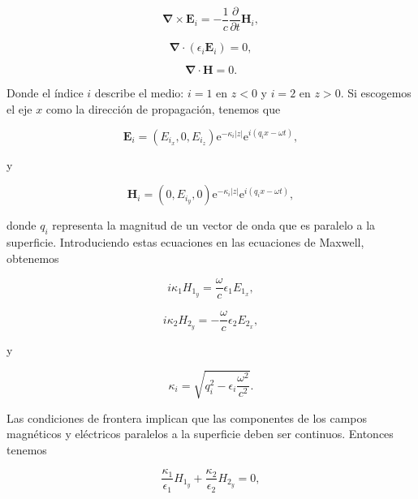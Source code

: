 \documentclass[a4paper,11pt]{article}
\numberwithin{equation}{section}
\newcommand{\euler}{\mathrm{e}}
\begin{document}
\begin{equation}
 \pmb{\nabla} \times \mathbf{E}_i = - \frac{1}{c} \frac{\partial}{\partial t} 
 \mathbf{H}_i,
\end{equation}

\begin{equation}
 \pmb{\nabla} \cdot (\epsilon_i \mathbf{E}_i) = 0,
\end{equation}

\begin{equation}
 \pmb{\nabla} \cdot \mathbf{H} = 0.
\end{equation}

Donde el índice $i$ describe el medio: $i = 1$ en $z < 0$ y $i = 2$ en $z > 0$. Si 
escogemos el eje $x$ como la dirección de propagación, tenemos que 

\begin{equation}
 \mathbf{E}_i = (E_{i_x},0,E_{i_z}) \euler^{-\kappa_i|z|} \euler^{i(q_i x - \omega t)},
\end{equation}

y 

\begin{equation}
 \mathbf{H}_i = (0,E_{i_y},0) \euler^{-\kappa_i|z|} \euler^{i(q_i x - \omega t)},
\end{equation}

donde $q_i$ representa la magnitud de un vector de onda que es paralelo a la 
superficie. Introduciendo estas ecuaciones en las ecuaciones de Maxwell, obtenemos 

\begin{equation}
 i \kappa_1 H_{1_y} = \frac{\omega}{c} \epsilon_1 E_{1_x}, 
\end{equation}

\begin{equation}
 i \kappa_2 H_{2_y} = - \frac{\omega}{c} \epsilon_2 E_{2_x},
\end{equation}

y 

\begin{equation}
 \kappa_i = \sqrt{q_i^2 - \epsilon_i \frac{\omega^2}{c^2}}.
\end{equation}

Las condiciones de frontera implican que las componentes de los campos magnéticos 
y eléctricos paralelos a la superficie deben ser continuos. Entonces tenemos 

\begin{equation}
 \frac{\kappa_1}{\epsilon_1} H_{1_y} + \frac{\kappa_2}{\epsilon_2} H_{2_y} = 0,
\end{equation}
\end{document}
